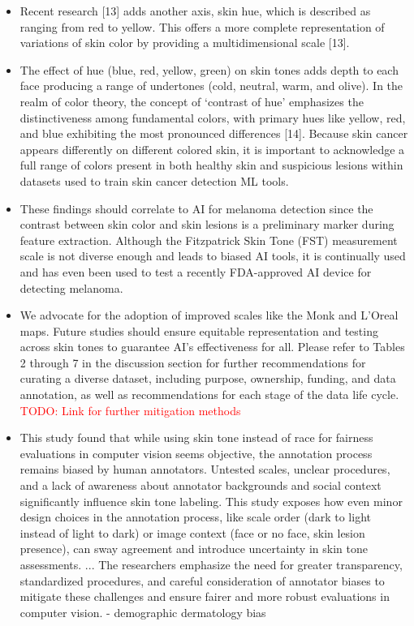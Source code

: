 \documentclass[12pt, a4paper, oneside]{book}   	%
\renewcommand{\todo}[1]{\textcolor{red}{TODO: #1}}
\newif\ifrawcitationactive
\newcommand{\rawcitationend}{\color{black}\rawcitationactivefalse}
\begin{document}
\begin{itemize}
			\item Recent research [13] adds another axis, skin hue, which is described as ranging from red to yellow. This offers a more complete representation of variations of skin color by providing a multidimensional scale [13]. \autocite{Montoya_2025}
			\item The effect of hue (blue, red, yellow, green) on skin tones adds depth to each face producing a range of undertones (cold, neutral, warm, and olive). In the realm of color theory, the concept of ‘contrast of hue’ emphasizes the distinctiveness among fundamental colors, with primary hues like yellow, red, and blue exhibiting the most pronounced differences [14]. Because skin cancer appears differently on different colored skin, it is important to acknowledge a full range of colors present in both healthy skin and suspicious lesions within datasets used to train skin cancer detection ML tools. \autocite{Montoya_2025}
			\item These findings should correlate to AI for melanoma detection since the contrast between skin color and skin lesions is a preliminary marker during feature extraction. Although the Fitzpatrick Skin Tone (FST) measurement scale is not diverse enough and leads to biased AI tools, it is continually used and has even been used to test a recently FDA-approved AI device for detecting melanoma. \autocite{Montoya_2025}
			\item We advocate for the adoption of improved scales like the Monk and L’Oreal maps. Future studies should ensure equitable representation and testing across skin tones to guarantee AI’s effectiveness for all. Please refer to Tables 2 through 7 in the discussion section for further recommendations for curating a diverse dataset, including purpose, ownership, funding, and data annotation, as well as recommendations for each stage of the data life cycle. \autocite{Montoya_2025} \todo{Link for further mitigation methods}
			\item This study found that while using skin tone instead of race for fairness evaluations in computer vision seems objective, the annotation process remains biased by human annotators. Untested scales, unclear procedures, and a lack of awareness about annotator backgrounds and social context significantly influence skin tone labeling. This study exposes how even minor design choices in the annotation process, like scale order (dark to light instead of light to dark) or image context (face or no face, skin lesion presence), can sway agreement and introduce uncertainty in skin tone assessments. ... The researchers emphasize the need for greater transparency, standardized procedures, and careful consideration of annotator biases to mitigate these challenges and ensure fairer and more robust evaluations in computer vision. \autocite{Montoya_2025} - demographic dermatology bias
		\end{itemize}
	\rawcitationend
	
\end{document}
